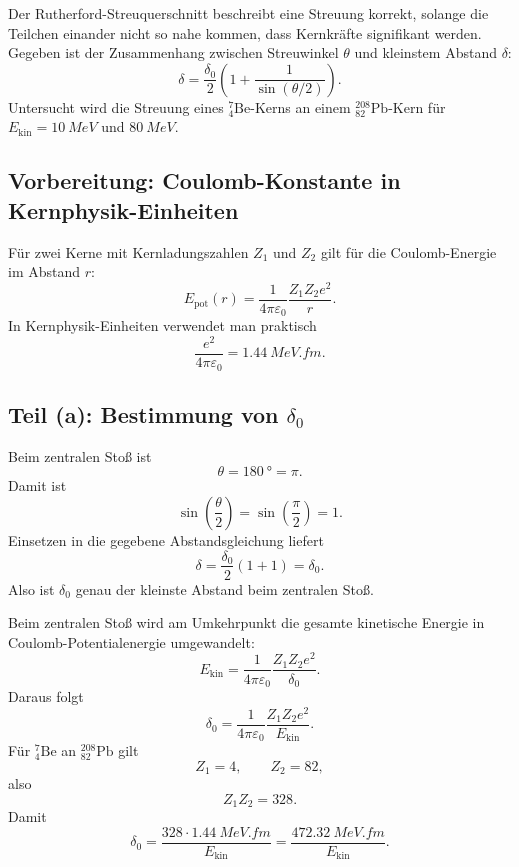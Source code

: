 \documentclass[11pt,a4paper]{scrartcl}
\newcommand{\paren}[1]{\left( #1 \right)}
\newcommand{\nuclide}[3]{^{#1}_{#2}\mathrm{#3}}
\begin{document}
\begin{taskbox}
Der Rutherford-Streuquerschnitt beschreibt eine Streuung korrekt, solange die Teilchen einander nicht so nahe kommen, dass Kernkr\"afte signifikant werden. Gegeben ist der Zusammenhang zwischen Streuwinkel $\theta$ und kleinstem Abstand $\delta$:
\[
    \delta=\frac{\delta_0}{2}\paren{1+\frac{1}{\sin(\theta/2)}}.
\]
Untersucht wird die Streuung eines $\nuclide{7}{4}{Be}$-Kerns an einem $\nuclide{208}{82}{Pb}$-Kern f\"ur $E_{\mathrm{kin}}=\SI{10}{MeV}$ und $\SI{80}{MeV}$.
\end{taskbox}

\subsection{Vorbereitung: Coulomb-Konstante in Kernphysik-Einheiten}

\begin{formulabox}
F\"ur zwei Kerne mit Kernladungszahlen $Z_1$ und $Z_2$ gilt f\"ur die Coulomb-Energie im Abstand $r$:
\[
    E_{\mathrm{pot}}(r)=\frac{1}{4\pi\varepsilon_0}\frac{Z_1Z_2e^2}{r}.
\]
In Kernphysik-Einheiten verwendet man praktisch
\[
    \frac{e^2}{4\pi\varepsilon_0}=\SI{1.44}{MeV.fm}.
\]
\end{formulabox}

\subsection{Teil (a): Bestimmung von $\delta_0$}

\begin{calculationbox}[title=Zentraler Sto\ss{}]
Beim zentralen Sto\ss{} ist
\[
    \theta=\SI{180}{\degree}=\pi.
\]
Damit ist
\[
    \sin\paren{\frac{\theta}{2}}=\sin\paren{\frac{\pi}{2}}=1.
\]
Einsetzen in die gegebene Abstandsgleichung liefert
\[
    \delta=\frac{\delta_0}{2}(1+1)=\delta_0.
\]
Also ist $\delta_0$ genau der kleinste Abstand beim zentralen Sto\ss{}.
\end{calculationbox}

\begin{calculationbox}[title=Energieumwandlung bei gr\"o\ss{}ter Ann\"aherung]
Beim zentralen Sto\ss{} wird am Umkehrpunkt die gesamte kinetische Energie in Coulomb-Potentialenergie umgewandelt:
\[
    E_{\mathrm{kin}}=\frac{1}{4\pi\varepsilon_0}\frac{Z_1Z_2e^2}{\delta_0}.
\]
Daraus folgt
\[
    \delta_0=\frac{1}{4\pi\varepsilon_0}\frac{Z_1Z_2e^2}{E_{\mathrm{kin}}}.
\]
F\"ur $\nuclide{7}{4}{Be}$ an $\nuclide{208}{82}{Pb}$ gilt
\[
    Z_1=4,\qquad Z_2=82,
\]
also
\[
    Z_1Z_2=328.
\]
Damit
\[
    \delta_0=\frac{328\cdot\SI{1.44}{MeV.fm}}{E_{\mathrm{kin}}}
    =\frac{\SI{472.32}{MeV.fm}}{E_{\mathrm{kin}}}.
\]
\end{calculationbox}
\end{document}
